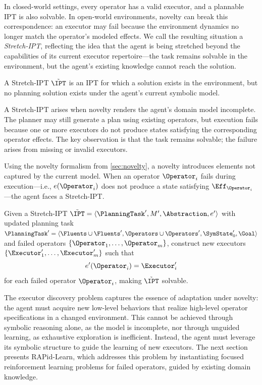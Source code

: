 In closed-world settings, every operator has a valid executor, and a plannable IPT is also solvable. In open-world environments, novelty can break this correspondence: an executor may fail because the environment dynamics no longer match the operator’s modeled effects. We call the resulting situation a \emph{Stretch-IPT}, reflecting the idea that the agent is being stretched beyond the capabilities of its current executor repertoire---the task remains solvable in the environment, but the agent's existing knowledge cannot reach the solution.

\begin{definition}
\label{def:stretch_ipt}
A Stretch-IPT $\tilde{\IPT}$ is an IPT for which a solution exists in the environment, but no planning solution exists under the agent’s current symbolic model.
\end{definition}

A Stretch-IPT arises when novelty renders the agent’s domain model incomplete. The planner may still generate a plan using existing operators, but execution fails because one or more executors do not produce states satisfying the corresponding operator effects. The key observation is that the task remains solvable; the failure arises from missing or invalid executors.

Using the novelty formalism from \cref{sec:novelty}, a novelty introduces elements not captured by the current model. When an operator $\Operator_i$ fails during execution—i.e., $e(\Operator_i)$ does not produce a state satisfying $\Eff_{\Operator_i}$—the agent faces a Stretch-IPT.

\begin{definition}
\label{def:edp}
Given a Stretch-IPT $\tilde{\IPT} = \langle \PlanningTask', M', \Abstraction, e' \rangle$ with updated planning task $\PlanningTask' = \langle \Fluents \cup \Fluents', \Operators \cup \Operators', \SymState_0', \Goal \rangle$ and failed operators $\{\Operator_1, \ldots, \Operator_m\}$, construct new executors $\{\Executor'_1, \ldots, \Executor'_m\}$ such that
\[
e'(\Operator_i) = \Executor'_i
\]
for each failed operator $\Operator_i$, making $\tilde{\IPT}$ solvable.
\end{definition}




The executor discovery problem captures the essence of adaptation under novelty: the agent must acquire new low-level behaviors that realize high-level operator specifications in a changed environment. This cannot be achieved through symbolic reasoning alone, as the model is incomplete, nor through unguided learning, as exhaustive exploration is inefficient. Instead, the agent must leverage its symbolic structure to guide the learning of new executors. The next section presents RAPid-Learn, which addresses this problem by instantiating focused reinforcement learning problems for failed operators, guided by existing domain knowledge.